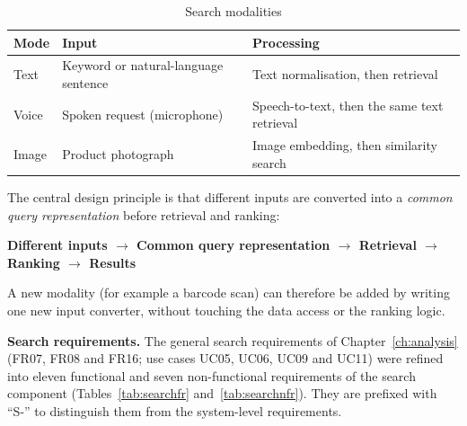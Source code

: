 \begin{table}[H]
\centering
\small
\caption{Search modalities}
\label{tab:searchmodes}
\begin{tabular}{@{}p{1.6cm} p{5.0cm} p{7.4cm}@{}}
\toprule
\textbf{Mode} & \textbf{Input} & \textbf{Processing} \\ \midrule
Text & Keyword or natural-language sentence & Text normalisation, then retrieval \\
Voice & Spoken request (microphone) & Speech-to-text, then the same text retrieval \\
Image & Product photograph & Image embedding, then similarity search \\ \bottomrule
\end{tabular}
\end{table}

The central design principle is that different inputs are converted into a \emph{common query representation} before retrieval and ranking:
\begin{center}
\textbf{Different inputs $\rightarrow$ Common query representation $\rightarrow$ Retrieval $\rightarrow$ Ranking $\rightarrow$ Results}
\end{center}
A new modality (for example a barcode scan) can therefore be added by writing one new input converter, without touching the data access or the ranking logic.

\textbf{Search requirements.} The general search requirements of Chapter~\ref{ch:analysis} (FR07, FR08 and FR16; use cases UC05, UC06, UC09 and UC11) were refined into eleven functional and seven non-functional requirements of the search component (Tables~\ref{tab:searchfr} and~\ref{tab:searchnfr}). They are prefixed with ``S-'' to distinguish them from the system-level requirements.

